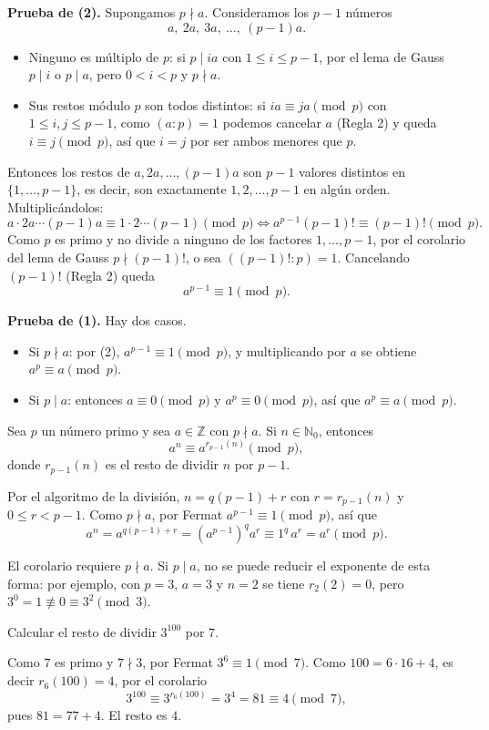 \begin{demostracion}
\textbf{Prueba de (2).} Supongamos $p\nmid a$. Consideramos los $p-1$ números
\[
a,\ 2a,\ 3a,\ \dots,\ (p-1)a.
\]
\begin{itemize}
    \item Ninguno es múltiplo de $p$: si $p\mid ia$ con $1\le i\le p-1$, por el
    lema de Gauss $p\mid i$ o $p\mid a$, pero $0<i<p$ y $p\nmid a$.
    \item Sus restos módulo $p$ son todos distintos: si $ia\equiv ja \pmod p$
    con $1\le i,j\le p-1$, como $(a:p)=1$ podemos cancelar $a$ (Regla 2) y
    queda $i\equiv j \pmod p$, así que $i=j$ por ser ambos menores que $p$.
\end{itemize}
Entonces los restos de $a,2a,\dots,(p-1)a$ son $p-1$ valores distintos en
$\{1,\dots,p-1\}$, es decir, son exactamente $1,2,\dots,p-1$ en algún orden.
Multiplicándolos:
\[
a\cdot 2a\cdots (p-1)a\equiv 1\cdot 2\cdots (p-1) \pmod p
\iff a^{p-1}(p-1)!\equiv (p-1)! \pmod p.
\]
Como $p$ es primo y no divide a ninguno de los factores $1,\dots,p-1$, por el
corolario del lema de Gauss $p\nmid (p-1)!$, o sea $((p-1)!:p)=1$. Cancelando
$(p-1)!$ (Regla 2) queda
\[
a^{p-1}\equiv 1 \pmod p.
\]

\textbf{Prueba de (1).} Hay dos casos.
\begin{itemize}
    \item Si $p\nmid a$: por (2), $a^{p-1}\equiv 1 \pmod p$, y multiplicando por
    $a$ se obtiene $a^p\equiv a \pmod p$.
    \item Si $p\mid a$: entonces $a\equiv 0 \pmod p$ y $a^p\equiv 0 \pmod p$,
    así que $a^p\equiv a \pmod p$.
\end{itemize}
\end{demostracion}

\begin{proposicion}[{title={Corolario}}]
Sea $p$ un número primo y sea $a\in\mathbb{Z}$ con $p\nmid a$. Si $n\in\mathbb{N}_0$,
entonces
\[
a^n\equiv a^{r_{p-1}(n)} \pmod p,
\]
donde $r_{p-1}(n)$ es el resto de dividir $n$ por $p-1$.
\end{proposicion}

\begin{demostracion}
Por el algoritmo de la división, $n=q(p-1)+r$ con $r=r_{p-1}(n)$ y
$0\le r<p-1$. Como $p\nmid a$, por Fermat $a^{p-1}\equiv 1 \pmod p$, así que
\[
a^n=a^{q(p-1)+r}=\left(a^{p-1}\right)^q a^r\equiv 1^q\, a^r=a^r \pmod p.
\]
\end{demostracion}

\begin{nota}{}
El corolario requiere $p\nmid a$. Si $p\mid a$, no se puede reducir el exponente
de esta forma: por ejemplo, con $p=3$, $a=3$ y $n=2$ se tiene $r_2(2)=0$, pero
$3^0=1\not\equiv 0\equiv 3^2 \pmod 3$.
\end{nota}

\begin{ejemplo}
Calcular el resto de dividir $3^{100}$ por $7$.

Como $7$ es primo y $7\nmid 3$, por Fermat $3^6\equiv 1 \pmod 7$. Como
$100=6\cdot 16+4$, es decir $r_6(100)=4$, por el corolario
\[
3^{100}\equiv 3^{r_6(100)}=3^4=81\equiv 4 \pmod 7,
\]
pues $81=77+4$. El resto es $4$.
\end{ejemplo}